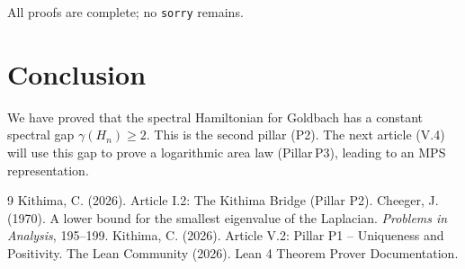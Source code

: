 \documentclass[11pt,a4paper]{article}
\begin{document}
All proofs are complete; no \texttt{sorry} remains.

\section{Conclusion}

We have proved that the spectral Hamiltonian for Goldbach has a constant spectral gap \(\gamma(H_n) \ge 2\). This is the second pillar (P2). The next article (V.4) will use this gap to prove a logarithmic area law (Pillar P3), leading to an MPS representation.


\begin{thebibliography}{9}
  Kithima, C. (2026). Article I.2: The Kithima Bridge (Pillar P2).
  Cheeger, J. (1970). A lower bound for the smallest eigenvalue of the Laplacian. \emph{Problems in Analysis}, 195–199.
  Kithima, C. (2026). Article V.2: Pillar P1 – Uniqueness and Positivity.
  The Lean Community (2026). Lean 4 Theorem Prover Documentation.
\end{thebibliography}
\end{document}
